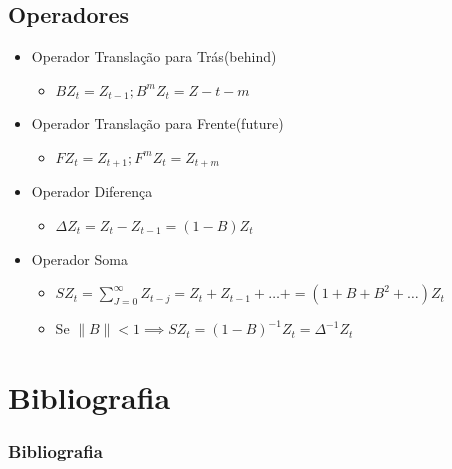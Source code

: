 \documentclass{beamer}
\begin{document}
\subsection{Operadores}
\begin{frame}
	\begin{itemize}
		\item<1-> Operador Translação para Trás(behind)
		\begin{itemize}
			\item $BZ_{t} = Z_{t-1}; B^{m}Z_{t} = Z-{t-m}  $
		\end{itemize}
		\item<1-> Operador Translação para Frente(future)
			\begin{itemize}
				\item $FZ_{t}=Z_{t+1}; F^{m}Z_{t}=Z_{t+m}$
			\end{itemize}
		\item<1-> Operador Diferença
			\begin{itemize}
				\item $ \Delta Z_{t}=Z_{t} - Z_{t-1} = (1-B)Z_{t}$ 
			\end{itemize}
		\item<1-> Operador Soma
			\begin{itemize}
				\item 	$SZ_{t} =  \sum_{J=0}^{\infty} Z_{t-j} = Z_{t} + Z_{t-1}+\dots+ = (1+B+B^{2}+\dots)Z_{t} $
				\item Se $\|B\|<1 \implies SZ_{t} = (1-B)^{-1}Z_{t}=\Delta^{-1}Z_{t}$
			\end{itemize}
		
	\end{itemize}
\end{frame}
    
	\section{Bibliografia}
	\begin{frame}[allowframebreaks]
		\frametitle{Bibliografia}
		
		
	\end{frame}
\end{document}
